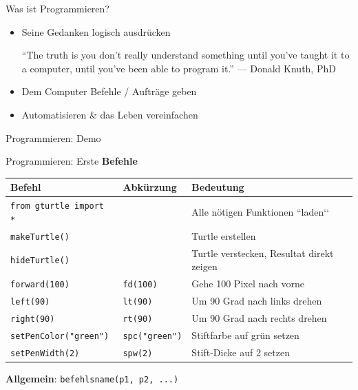 \begin{frame}{Was ist Programmieren?}
\begin{itemize}[<+->]
\item {} Seine Gedanken logisch ausdrücken
\begin{displayquote}
``The truth is you don’t really understand something until you’ve taught it to a computer, until you’ve been able to program it.'' --- Donald Knuth, PhD
\end{displayquote}
\item {} Dem Computer Befehle / Aufträge geben

\item {} Automatisieren \& das Leben vereinfachen

\end{itemize}
\end{frame}

\begin{frame}{Programmieren: Demo}
\end{frame}

\begin{frame}[fragile]{Programmieren: Erste \textbf{Befehle}}
\begin{table}[H]
\centering
\footnotesize
\begin{tabular}{l|l|p{4cm}}
\textbf{Befehl} & \textbf{Abkürzung} & \textbf{Bedeutung} \\\midrule\midrule
\lstinline[style=TigerJython]|from gturtle import *| &  & Alle nötigen Funktionen ``laden‘‘ \\\midrule
\lstinline[style=TigerJython]|makeTurtle()| &  & Turtle erstellen \\\midrule
\lstinline[style=TigerJython]|hideTurtle()| &  & Turtle verstecken, Resultat direkt zeigen \\\midrule
\lstinline[style=TigerJython]|forward(100)| & \lstinline[style=TigerJython]|fd(100)| & Gehe 100 Pixel nach vorne   \\\midrule
\lstinline[style=TigerJython]|left(90)| & \lstinline[style=TigerJython]|lt(90)| & Um 90 Grad nach links drehen   \\\midrule
\lstinline[style=TigerJython]|right(90)| & \lstinline[style=TigerJython]|rt(90)| & Um 90 Grad nach rechts drehen   \\\midrule
\lstinline[style=TigerJython]|setPenColor("green")| & \lstinline[style=TigerJython]|spc("green")| & Stiftfarbe auf grün setzen  \\\midrule
\lstinline[style=TigerJython]|setPenWidth(2)| & \lstinline[style=TigerJython]|spw(2)| & Stift-Dicke auf 2 setzen  \\
\end{tabular}
\end{table}

\textbf{Allgemein}: \lstinline[style=TigerJython]|befehlsname(p1, p2, ...)|
\end{frame}


